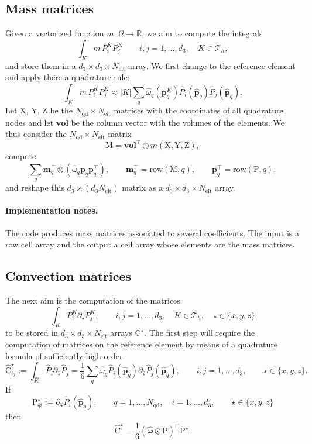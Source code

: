 \documentclass[10pt,english]{article}
\newcommand{\smallfrac}[2]{{\textstyle\frac{#1}{#2}}}
\newcommand{\Nelt}{{N_{\mathrm{elt}}}}
\newcommand{\Nnd}{{N_{\mathrm{qd}}}}
\begin{document}


\subsection{Mass matrices}

Given a vectorized function $m:\Omega \to \mathbb R$, we aim to compute the integrals
\[
\int_K m\, P_i^K P_j^K \qquad i,j=1,\ldots,d_3, \quad K\in \mathcal T_h,
\]
and store them in a $d_3\times d_3\times \Nelt$ array. We first change to the reference element and apply there a quadrature rule:
\[
\int_K m\, P_i^K P_j^K \approx |K|\sum_q \widehat\omega_q (\mathbf p_q^K) \widehat P_i(\widehat{\mathbf p}_q) \widehat P_j(\widehat{\mathbf p}_q).
\]
Let $\mathrm X$, $\mathrm Y$, $\mathrm Z$ be the $\Nnd\times\Nelt$ matrices with the coordinates of all quadrature nodes and let $\mathbf{vol}$ be the column vector with the volumes of the elements. We thus consider the $\Nnd\times\Nelt$ matrix
\[
\mathrm M = \mathbf{vol}^\top\odot m(\mathrm X,\mathrm Y,\mathrm Z),
\]
 compute
\[
\sum_q \mathbf m_q^\top \otimes (\widehat\omega_q\mathbf p_q\mathbf p_q^\top), \qquad \mathbf m_q^\top=\mathrm{row}(\mathrm M,q), \qquad \mathbf p_q^\top=\mathrm{row}(\mathrm P,q),
\]
and reshape this $d_3\times (d_3\Nelt)$ matrix as a $d_3\times d_3\times \Nelt$ array.

\paragraph{Implementation notes.} The code produces mass matrices associated to several coefficients. The input is a row cell array and the output a cell array whose elements are the mass matrices.




\subsection{Convection matrices}\label{sec:3.6}

The next aim is the computation of the matrices
\[
\int_K P_i^K \partial_\star P_j^K, \qquad i,j=1,\ldots,d_3, \quad K\in \mathcal T_h, \quad \star\in \{x,y,z\}
\]
to be stored in $d_3\times d_3\times \Nelt$ arrays $\mathrm C^\star$.  The first step will require the computation of matrices on the reference element by means of a quadrature formula of sufficiently high order:
\[
\widehat{\mathrm C}^\star_{ij} :=\int_{\widehat K} \widehat P_i \partial_{\widehat\star} \widehat P_j =\smallfrac16\sum_q \widehat\omega_q \widehat P_i(\widehat{\mathbf p}_q) \partial_{\widehat\star} \widehat P_j(\widehat{\mathbf p}_q), \qquad i,j=1,\ldots,d_3, \qquad \star\in \{x,y,z\}.
\]
If
\[
\mathrm P_{qi}^\star:=\partial_{\widehat\star} \widehat P_i(\widehat{\mathbf p}_q), \qquad q=1,\ldots,\Nnd, \quad i=1,\ldots,d_3, \qquad \star\in \{x,y,z\}
\]
then
\[
\widehat{\mathrm  C}^\star=\smallfrac16(\widehat{\boldsymbol\omega}\odot\mathrm P)^\top \mathrm P^\star.
\]
\end{document}

